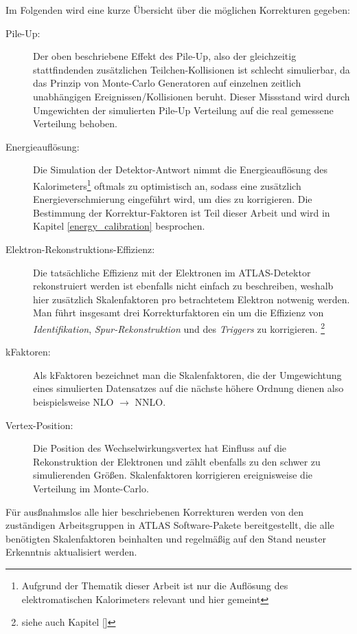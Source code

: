 Im Folgenden wird eine kurze Übersicht über die möglichen Korrekturen gegeben:

\begin{description}
    \item[Pile-Up:] Der oben beschriebene Effekt des Pile-Up, also der
        gleichzeitig stattfindenden zusätzlichen Teilchen-Kollisionen ist
        schlecht simulierbar, da das Prinzip von Monte-Carlo Generatoren auf
        einzelnen zeitlich unabhängigen Ereignissen/Kollisionen beruht. Dieser
        Missstand wird durch Umgewichten der simulierten Pile-Up Verteilung auf
        die real gemessene Verteilung behoben.
    \item[Energieauflösung:] Die Simulation der Detektor-Antwort nimmt die
        Energieauflösung des Kalorimeters\footnote{Aufgrund der Thematik dieser
        Arbeit ist nur die Auflösung des elektromatischen Kalorimeters relevant
        und hier gemeint} oftmals zu optimistisch an, sodass eine zusätzlich
        Energieverschmierung eingeführt wird, um dies zu korrigieren. Die
        Bestimmung der Korrektur-Faktoren ist Teil dieser Arbeit und wird in
        Kapitel \ref{energy_calibration} besprochen.
    \item[Elektron-Rekonstruktions-Effizienz:] Die tatsächliche Effizienz mit
        der Elektronen im ATLAS-Detektor rekonstruiert werden ist ebenfalls
        nicht einfach zu beschreiben, weshalb hier zusätzlich Skalenfaktoren
        pro betrachtetem Elektron notwenig werden. Man führt insgesamt drei
        Korrekturfaktoren ein um die Effizienz von \textit{Identifikation},
        \textit{Spur-Rekonstruktion} und des \textit{Triggers} zu korrigieren.
        \footnote{siehe auch Kapitel \ref{}}
    \item[kFaktoren:] Als kFaktoren bezeichnet man die Skalenfaktoren, die der
        Umgewichtung eines simulierten Datensatzes auf die nächste höhere
        Ordnung dienen also beispielsweise NLO $\rightarrow$ NNLO.
    \item[Vertex-Position:] Die Position des Wechselwirkungsvertex hat Einfluss
        auf die Rekonstruktion der Elektronen und zählt ebenfalls zu den schwer
        zu simulierenden Größen. Skalenfaktoren korrigieren ereignisweise die
        Verteilung im Monte-Carlo.
\end{description}

Für ausßnahmslos alle hier beschriebenen Korrekturen werden von den zuständigen
Arbeitsgruppen in ATLAS Software-Pakete bereitgestellt, die alle benötigten
Skalenfaktoren beinhalten und regelmäßig auf den Stand neuster Erkenntnis
aktualisiert werden.



